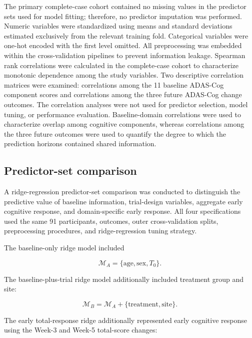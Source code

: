 \documentclass[11pt]{article}
\begin{document}
The primary complete-case cohort contained no missing values in the predictor sets used for
model fitting; therefore, no predictor imputation was performed. Numeric variables were
standardized using means and standard deviations estimated exclusively from the relevant
training fold. Categorical variables were one-hot encoded with the first level omitted.
All preprocessing was embedded within the cross-validation pipelines to prevent information
leakage. Spearman rank correlations were calculated in the complete-case cohort to characterize
monotonic dependence among the study variables. Two descriptive correlation matrices were
examined: correlations among the 11 baseline ADAS-Cog component scores and correlations among
the three future ADAS-Cog change outcomes. The correlation analyses were not used for predictor selection, model tuning, or performance
evaluation. Baseline-domain correlations were used to characterize overlap among cognitive
components, whereas correlations among the three future outcomes were used to quantify the
degree to which the prediction horizons contained shared information.


\subsection{Predictor-set comparison}

A ridge-regression predictor-set comparison was conducted to distinguish the predictive value
of baseline information, trial-design variables, aggregate early cognitive response, and
domain-specific early response. All four specifications used the same 91 participants,
outcomes, outer cross-validation splits, preprocessing procedures, and ridge-regression
tuning strategy.

The baseline-only ridge model included

\begin{equation}
\mathcal{M}_{A}
=
\{
\mathrm{age},
\mathrm{sex},
T_{0}
\}.
\end{equation}

The baseline-plus-trial ridge model additionally included treatment group and site:

\begin{equation}
\mathcal{M}_{B}
=
\mathcal{M}_{A}
+
\{
\mathrm{treatment},
\mathrm{site}
\}.
\end{equation}

The early total-response ridge additionally represented early cognitive response using
the Week-3 and Week-5 total-score changes:
\end{document}
